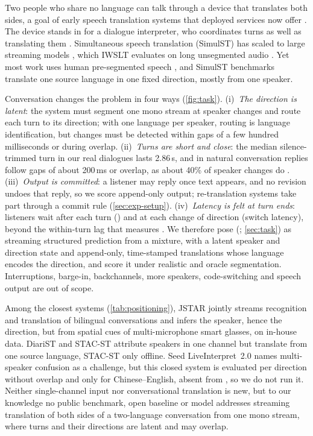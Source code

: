 Two people who share no language can talk through a device that translates both sides, a goal of early speech translation systems \citep{waibel1996interactive,wahlster2000verbmobil} that deployed services now offer \citep{lewis2015skype}.
The device stands in for a dialogue interpreter, who coordinates turns as well as translating them \citep{wadensjo1998interpreting,roy2000interpreting}.
Simultaneous speech translation (SimulST) has scaled to large streaming models \citep{seamless2023seamless,labiausse2025highfidelity}, which IWSLT evaluates on long unsegmented audio \citep{abdulmumin2025findings,adelani2026speech}.
Yet most work uses human pre-segmented speech \citep{papi2025how}, and SimulST benchmarks translate one source language in one fixed direction, mostly from one speaker.

Conversation changes the problem in four ways (\cref{fig:task}).
(i)~\emph{The direction is latent}: the system must segment one mono stream at speaker changes and route each turn to its direction; with one language per speaker, routing is language identification, but changes must be detected within gaps of a few hundred milliseconds or during overlap.
(ii)~\emph{Turns are short and close}: the median silence-trimmed turn in our real dialogues lasts 2.86\,s, and in natural conversation replies follow gaps of about 200\,ms \citep{levinson2015timing} or overlap, as about 40\% of speaker changes do \citep{heldner2010pauses}.
(iii)~\emph{Output is committed}: a listener may reply once text appears, and no revision undoes that reply, so we score append-only output; re-translation systems \citep{arivazhagan2020retranslation} take part through a commit rule (\cref{sec:exp-setup}).
(iv)~\emph{Latency is felt at turn ends}: listeners wait after each turn (\eo) and at each change of direction (switch latency), beyond the within-turn lag that \laal measures \citep{papi2024streamatt}.
We therefore pose \taskfull (\task; \cref{sec:task}) as streaming structured prediction from a mixture, with a latent speaker and direction state and append-only, time-stamped translations whose language encodes the direction, and score it under realistic and oracle segmentation.
Interruptions, barge-in, backchannels, more speakers, code-switching and speech output are out of scope.

Among the closest systems (\cref{tab:positioning}), JSTAR \citep{moritz2025transcribing} jointly streams recognition and translation of bilingual conversations and infers the speaker, hence the direction, but from spatial cues of multi-microphone smart glasses, on in-house data.
DiariST \citep{yang2024diarist} and STAC-ST \citep{zuluagagomez2023end} attribute speakers in one channel but translate from one source language, STAC-ST only offline.
Seed LiveInterpret~2.0 \citep{cheng2025seed} names multi-speaker confusion as a challenge, but this closed system is evaluated per direction without overlap and only for Chinese--English, absent from \bench, so we do not run it.
Neither single-channel input nor conversational translation is new, but to our knowledge no public benchmark, open baseline or model addresses streaming translation of both sides of a two-language conversation from one mono stream, where turns and their directions are latent and may overlap.

